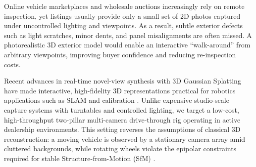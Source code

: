 \documentclass[letterpaper, 10 pt, conference]{ieeeconf}  %
\begin{document}

Online vehicle marketplaces and wholesale auctions increasingly rely on remote inspection, yet listings usually provide only a small set of 2D photos captured under uncontrolled lighting and viewpoints. As a result, subtle exterior defects such as light scratches, minor dents, and panel misalignments are often missed. A photorealistic 3D exterior model would enable an interactive ``walk-around'' from arbitrary viewpoints, improving buyer confidence and reducing re-inspection costs.

Recent advances in real-time novel-view synthesis with 3D Gaussian Splatting have made interactive, high-fidelity 3D representations practical for robotics applications such as SLAM \cite{sun2024mm3dgs} and calibration \cite{herau20243dgs}. Unlike expensive studio-scale capture systems with turntables and controlled lighting, we target a low-cost, high-throughput two-pillar multi-camera drive-through rig operating in active dealership environments. This setting reverses the assumptions of classical 3D reconstruction: a moving vehicle is observed by a stationary camera array amid cluttered backgrounds, while rotating wheels violate the epipolar constraints required for stable Structure-from-Motion (SfM) \cite{schonberger2016structure}.
\end{document}
